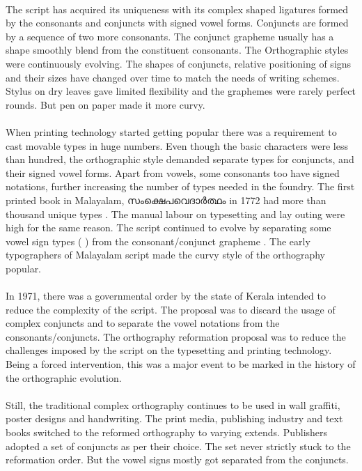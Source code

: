 \documentclass[10pt]{article}
\begin{document}
\paragraph{}
The script has acquired its uniqueness with its complex shaped ligatures formed by the consonants and conjuncts with signed vowel forms. Conjuncts are formed by a sequence of two more consonants. The conjunct grapheme usually has a shape smoothly blend from the constituent consonants. The Orthographic styles were continuously evolving. The shapes of conjuncts, relative positioning of signs and their sizes have changed over time to match the needs of writing schemes. Stylus on dry leaves gave limited flexibility and the graphemes were rarely perfect rounds. But pen on paper made it more curvy.

\paragraph{}
When printing technology started getting popular there was a requirement to cast movable types in huge numbers. Even though the basic characters were less than hundred, the orthographic style demanded separate types for conjuncts, and their signed vowel forms. Apart from vowels, some consonants too have signed notations, further increasing the number of types needed in the foundry. The first printed book in Malayalam, \begingroup \myfont സംക്ഷെപവെദാർത്ഥം \endgroup in 1772 had more than thousand unique types \cite{}. The manual labour on typesetting and lay outing were high for the same reason. The script continued to evolve by separating some vowel sign types (\begingroup {} \endgroup) from the consonant/conjunct grapheme . The early typographers of Malayalam script made the curvy style of the orthography popular. 

\paragraph{}
In 1971, there was a governmental order by the state of Kerala intended to reduce the complexity of the script. The proposal was to discard the usage of complex conjuncts and to separate the vowel notations from the consonants/conjuncts.  The orthography  reformation proposal was to reduce the challenges imposed by the script on the typesetting and printing technology. Being a forced intervention, this was a major event to be marked in the history of the orthographic evolution. 

\paragraph{}
Still, the traditional complex orthography continues to be used in wall graffiti, poster designs and handwriting. The print media, publishing industry  and text books switched to the reformed orthography to varying extends. Publishers adopted a set of conjuncts as per their choice. The set never strictly stuck to the reformation order. But the vowel signs mostly got separated from the conjuncts. 
\end{document}
